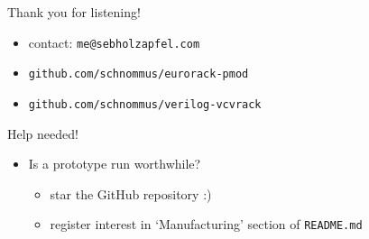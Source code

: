 \documentclass{beamer}
\begin{document}
\begin{frame}{Thank you for listening!}

    \begin{itemize}
        \item contact: \texttt{me@sebholzapfel.com}
        \item \texttt{github.com/schnommus/eurorack-pmod}
        \item \texttt{github.com/schnommus/verilog-vcvrack}
    \end{itemize}

    \begin{block}{Help needed!}
        \begin{itemize}
            \item Is a prototype run worthwhile?
            \begin{itemize}
                \item star the GitHub repository :)
                \item register interest in `Manufacturing' section of \texttt{README.md}
            \end{itemize}
        \end{itemize}
    \end{block}

\end{frame}
\end{document}
